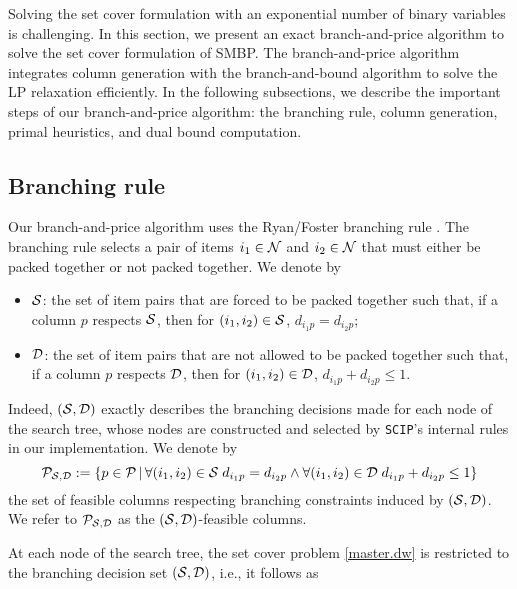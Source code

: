 \label{sec.bp}
Solving the set cover formulation with an exponential number of binary variables is challenging.
In this section, we present an exact branch-and-price algorithm to solve the set cover formulation of SMBP. The branch-and-price algorithm integrates column generation with the branch-and-bound algorithm to solve the LP relaxation efficiently. In the following subsections, we describe the important steps of our branch-and-price algorithm: the branching rule, column generation, primal heuristics, and dual bound computation.

\subsection{Branching rule}

 Our branch-and-price algorithm uses the Ryan/Foster branching rule \citep{ryan1981integer}. The branching rule selects a pair of items $i_1 \in \mathcal N$ and $i_2 \in \mathcal N$ that must either be packed together or not packed together. We denote by

\begin{itemize}

 \item $\mathcal S$: the set of item pairs that are forced to be packed together such that, if a column $p$ respects $\mathcal S$, then for $(i_1, i_2) \in \mathcal S$, $d_{i_1p} = d_{i_2p}$;

 \item $\mathcal D$: the set of item pairs that are not allowed to be packed together such that, if a column $p$ respects $\mathcal D$, then for $(i_1, i_2) \in \mathcal D$, $d_{i_1p} + d_{i_2p} \le 1$.

\end{itemize}

Indeed, $(\mathcal S, \mathcal D)$ exactly describes the branching decisions made for each node of the search tree, whose nodes are constructed and selected by \texttt{SCIP}'s internal rules \cite{achterberg2008constraint} in our implementation.
We denote by
\begin{equation*}
 \mathcal P_{\mathcal S, \mathcal D} := \{p \in \mathcal P \,|\, \forall (i_1, i_2) \in \mathcal S \; d_{i_1p} = d_{i_2p} \land \forall (i_1, i_2) \in \mathcal D\; d_{i_1p} + d_{i_2p} \le 1\}
\end{equation*}
the set of feasible columns respecting branching constraints induced by $(\mathcal S, \mathcal D)$. We refer to $\mathcal P_{\mathcal S, \mathcal D}$ as the $(\mathcal S, \mathcal D)$-feasible columns.


At each node of the search tree, the set cover problem \eqref{master.dw} is restricted to the branching decision set \((\mathcal S, \mathcal D)\), i.e., it follows as



